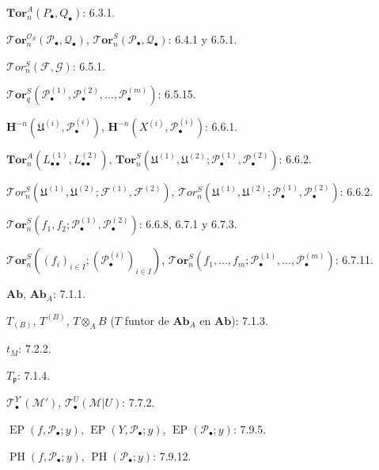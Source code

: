 \documentclass[10pt,oneside]{book}
\begin{document}
\begin{flushleft}
$\mathbf{Tor}_n^A(P_\bullet,Q_\bullet)$: 6.3.1.

\medskip
$\boldsymbol{\mathscr T\!or}_n^{\mathscr O_S}(\mathscr P_\bullet,\mathscr Q_\bullet)$,
$\boldsymbol{\mathscr{T}\!or}_n^S(\mathscr P_\bullet,\mathscr Q_\bullet)$: 6.4.1 y 6.5.1.

\medskip
$\mathscr{T}\!or_n^S(\mathscr F,\mathscr G)$: 6.5.1.

\medskip
$\boldsymbol{\mathscr T\!or}_q^S(\mathscr P_\bullet^{(1)},\mathscr P_\bullet^{(2)},\ldots,
\mathscr P_\bullet^{(m)})$: 6.5.15.

\medskip
$\mathbf H^{-n}(\mathfrak U^{(i)},\mathscr P_\bullet^{(i)})$,
$\mathbf H^{-n}(X^{(i)},\mathscr P_\bullet^{(i)})$: 6.6.1.

\medskip
$\mathbf{Tor}_n^A(L_{\bullet\bullet}^{(1)},L_{\bullet\bullet}^{(2)})$,
$\mathbf{Tor}_n^S(\mathfrak U^{(1)},\mathfrak U^{(2)};
\mathscr P_\bullet^{(1)},\mathscr P_\bullet^{(2)})$: 6.6.2.

\medskip
$\mathscr{T}\!or_n^S(\mathfrak U^{(1)},\mathfrak U^{(2)};
\mathscr F^{(1)},\mathscr F^{(2)})$,
$\mathscr{T}\!or_n^S(\mathfrak U^{(1)},\mathfrak U^{(2)};
\mathscr P_\bullet^{(1)},\mathscr P_\bullet^{(2)})$: 6.6.2.

\medskip
$\boldsymbol{\mathscr T\!or}_n^S(f_1,f_2;\mathscr P_\bullet^{(1)},
\mathscr P_\bullet^{(2)})$: 6.6.8, 6.7.1 y 6.7.3.

\medskip
$\boldsymbol{\mathscr T\!or}_n^S((f_i)_{i\in I};(\mathscr P_\bullet^{(i)})_{i\in I})$,
$\boldsymbol{\mathscr T\!or}_n^S(f_1,\ldots,f_m;\mathscr P_\bullet^{(1)},\ldots,
\mathscr P_\bullet^{(m)})$: 6.7.11.

\medskip
$\boldsymbol{Ab}$, $\boldsymbol{Ab}_A$: 7.1.1.

\medskip
$T_{(B)}$, $T^{(B)}$, $T\otimes_A B$
($T$ funtor de $\boldsymbol{Ab}_A$ en $\boldsymbol{Ab}$): 7.1.3.

\medskip
$t_M$: 7.2.2.

\medskip
$T_{\mathfrak p}$: 7.1.4.

\medskip
$\mathscr T_\bullet^{Y'}(\mathscr M')$,
$\mathscr T_\bullet^U(\mathscr M|U)$: 7.7.2.

\medskip
$\operatorname{EP}(f,\mathscr P_\bullet;y)$,
$\operatorname{EP}(Y,\mathscr P_\bullet;y)$,
$\operatorname{EP}(\mathscr P_\bullet;y)$: 7.9.5.

\medskip
$\operatorname{PH}(f,\mathscr P_\bullet;y)$,
$\operatorname{PH}(\mathscr P_\bullet;y)$: 7.9.12.
\end{flushleft}
\end{document}
